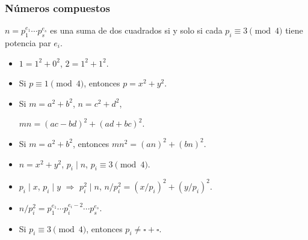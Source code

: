 \documentclass[handout]{beamer}
\begin{document}
\begin{frame}[fragile]
  \frametitle{Números compuestos}

  \begin{shaded}
    $n = p_1^{e_1} \cdots p_s^{e_s}$ es una suma de dos cuadrados si y solo si
    cada $p_i \equiv 3 \pmod{4}$ tiene potencia par $e_i$.
  \end{shaded}


  \begin{itemize}
  \item<3-> $1 = 1^2 + 0^2$, $2 = 1^2 + 1^2$.

  \item<4-> Si $p \equiv 1 \pmod{4}$, entonces $p = x^2 + y^2$.

  \item<5-> Si $m = a^2 + b^2$, $n = c^2 + d^2$,

    $mn = (ac - bd)^2 + (ad + bc)^2$.

  \item<6-> Si $m = a^2 + b^2$, entonces $mn^2 = (an)^2 + (bn)^2$.
  \end{itemize}


  \begin{itemize}
  \item<8-> $n = x^2 + y^2$, $p_i \mid n$, $p_i \equiv 3 \pmod{4}$.

  \item<9-> $p_i \mid x$, $p_i \mid y$ $\Longrightarrow$ $p_i^2 \mid n$,
    $n/p_i^2 = (x/p_i)^2 + (y/p_i)^2$.

  \item<10-> $n/p_i^2 = p_1^{e_1} \cdots p_i^{e_i - 2} \cdots p_s^{e_s}$.

  \item<11-> Si $p_i \equiv 3 \pmod{4}$, entonces $p_i \ne \square + \square$.
  \end{itemize}
\end{frame}

\end{document}
